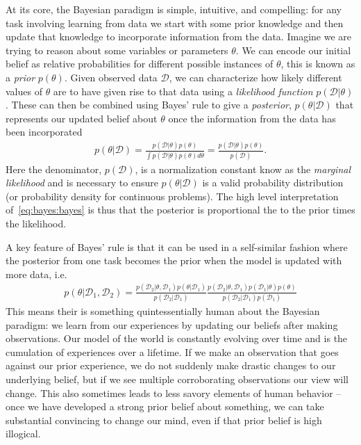 
At its core, the Bayesian paradigm is simple, intuitive, and compelling: for any task involving
learning from data we start with some prior knowledge and then update that knowledge to
incorporate information from the data.  Imagine we are trying to reason about some variables
or parameters $\theta$.  We can encode our initial belief as relative probabilities for different
possible instances of $\theta$, this is known as a \emph{prior} $p(\theta)$.  Given observed data
$\mathcal{D}$, we can characterize how likely different values of $\theta$ are to have given rise
to that data using a \emph{likelihood function} $p(\mathcal{D}|\theta)$.  These can then be
combined using Bayes' rule to give a \emph{posterior}, $p(\theta | \mathcal{D})$ that 
represents our updated belief about $\theta$ once the information from the data has been
incorporated
\begin{align}
	\label{eq:bayes:bayes}
	p(\theta | \mathcal{D}) = \frac{p(\mathcal{D} | \theta)p(\theta)}{\int p(\mathcal{D} | \theta)p(\theta) d\theta} 
	= \frac{p(\mathcal{D} | \theta)p(\theta)}{p(\mathcal{D})}.
\end{align}
Here the denominator, $p(\mathcal{D})$, is a normalization constant know as the \emph{marginal
	likelihood} and is necessary to ensure $p(\theta | \mathcal{D})$ is a valid probability distribution
(or probability density for continuous problems).  The high level interpretation of~\eqref{eq:bayes:bayes} is
thus that the posterior is proportional the to the prior times the likelihood.  

A key feature of Bayes' rule is that it can be used in a self-similar fashion where the posterior from
one task becomes the prior when the model is updated with more data, i.e.
\begin{align}
	\label{eq:bayes:repeat-bayes}
p(\theta | \mathcal{D}_1, \mathcal{D}_2) = 
\frac{p(\mathcal{D}_2 | \theta, \mathcal{D}_1)p(\theta | \mathcal{D}_1)}{p(\mathcal{D}_2 | \mathcal{D}_1)}
\frac{p(\mathcal{D}_2 | \theta, \mathcal{D}_1)p(\mathcal{D}_1 | \theta) p(\theta)}
{p(\mathcal{D}_2 | \mathcal{D}_1) p(\mathcal{D}_1)} 
\end{align}
This means their is something quintessentially human about the Bayesian paradigm: we learn
from our experiences by updating our beliefs after making observations.  Our model of the world
is constantly evolving over time and is the cumulation of experiences over a lifetime.  
If we make an observation that goes against our prior experience, we do not suddenly make
drastic changes to our underlying belief, but if we see multiple corroborating observations our
view will change.
This also sometimes leads to less savory elements of human behavior -- once we have developed
a strong prior belief about something, we can take substantial convincing to change our mind, even
if that prior belief is high illogical.

